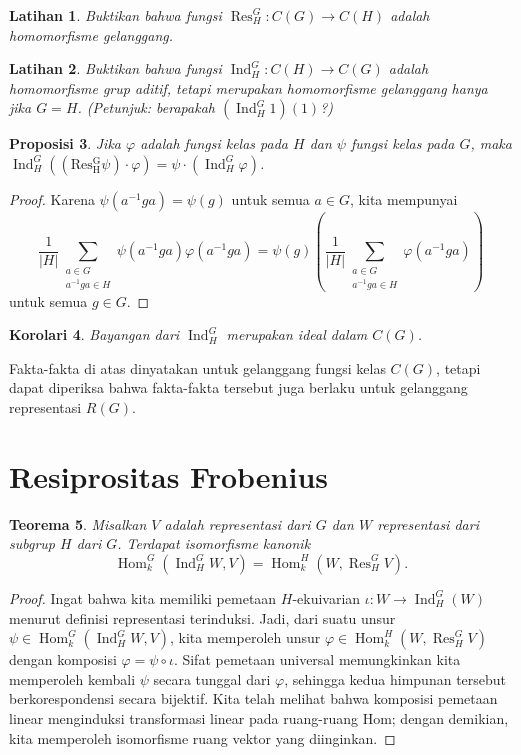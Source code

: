 \documentclass[12pt]{article}
\theoremstyle{plain}
\newtheorem{theorem}{Teorema}[section]
\newtheorem{proposition}[theorem]{Proposisi}
\newtheorem{corollary}[theorem]{Korolari}
\newtheorem{exercise}[theorem]{Latihan}
\theoremstyle{definition}
\theoremstyle{remark}
\numberwithin{equation}{section}
\begin{document}
\begin{exercise}
Buktikan bahwa fungsi
$\operatorname{Res}_H^G : C(G) \to C(H)$
adalah homomorfisme gelanggang.
\end{exercise}

\begin{exercise}
Buktikan bahwa fungsi
$\operatorname{Ind}_H^G : C(H) \to C(G)$
adalah homomorfisme grup aditif,
tetapi merupakan homomorfisme gelanggang hanya jika $G=H$.
(Petunjuk: berapakah $(\operatorname{Ind}_H^G 1)(1)$?)
\end{exercise}

\begin{proposition}
Jika $\varphi$ adalah fungsi kelas pada $H$ dan $\psi$ fungsi kelas
pada $G$, maka
$\operatorname{Ind}^G_H ( (\operatorname{Res^G_H} \psi) \cdot\varphi)
= \psi \cdot (\operatorname{Ind}^G_H \varphi)$.
\end{proposition}

\begin{proof}
Karena $\psi(a^{-1}ga)=\psi(g)$ untuk semua $a \in G$, kita mempunyai
\[
\frac{1}{|H|}\sum_{\substack{a \in G\\a^{-1}ga \in H}} \psi(a^{-1}ga)\varphi(a^{-1}ga)
 =
 \psi(g) \left(\frac{1}{|H|}\sum_{\substack{a \in G\\a^{-1}ga \in H}} \varphi(a^{-1}ga)
\right)
\]
untuk semua $g \in G$.
\end{proof}

\begin{corollary}
Bayangan dari $\operatorname{Ind}^G_H$ merupakan ideal dalam $C(G)$.
\end{corollary}

Fakta-fakta di atas dinyatakan untuk gelanggang fungsi kelas
$C(G)$, tetapi dapat diperiksa bahwa fakta-fakta tersebut juga berlaku untuk
gelanggang representasi $R(G)$.

\section{Resiprositas Frobenius}

\begin{theorem}
Misalkan $V$ adalah representasi dari $G$
dan $W$ representasi dari subgrup $H$ dari $G$.
Terdapat isomorfisme kanonik
\[
\operatorname{Hom}^G_k(\operatorname{Ind}_H^G W, V) =
\operatorname{Hom}^H_k(W,\operatorname{Res}_H^G  V).
\]
\end{theorem}

\begin{proof}
Ingat bahwa kita memiliki pemetaan $H$-ekuivarian
$\iota : W \to \operatorname{Ind}_H^G(W)$ menurut definisi
representasi terinduksi.
Jadi, dari suatu unsur
$\psi \in \operatorname{Hom}^G_k(\operatorname{Ind}_H^G W, V)$,
kita memperoleh unsur
$\varphi \in \operatorname{Hom}^H_k(W,\operatorname{Res}_H^G  V)$
dengan komposisi $\varphi = \psi \circ \iota$.
Sifat pemetaan universal memungkinkan kita memperoleh kembali $\psi$ secara tunggal dari $\varphi$,
sehingga kedua himpunan tersebut berkorespondensi secara bijektif.
Kita telah melihat bahwa komposisi pemetaan linear menginduksi transformasi linear
pada ruang-ruang Hom; dengan demikian, kita memperoleh isomorfisme
ruang vektor yang diinginkan.
\end{proof}
\end{document}
